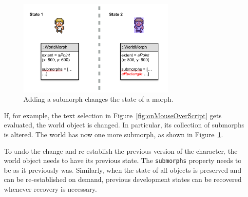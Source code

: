 \begin{figure}[h]
    \centering
    \includegraphics[width=0.7\textwidth]{figures/3_motivation/5_stateChanges.png}
    \caption{Adding a submorph changes the state of a morph.}
    \label{fig:changedCharacter}
\end{figure}

If, for example, the text selection in Figure~\ref{fig:onMouseOverScript} gets evaluated, the world object is changed.
In particular, its collection of submorphs is altered.
The world has now one more submorph, as shown in Figure~\ref{fig:changedCharacter}.

To undo the change and re-establish the previous version of the character, the world object needs to have its previous state.
The \lstinline{submorphs} property needs to be as it previously was.
Similarly, when the state of all objects is preserved and can be re-established on demand, previous development states can be recovered whenever recovery is necessary.
